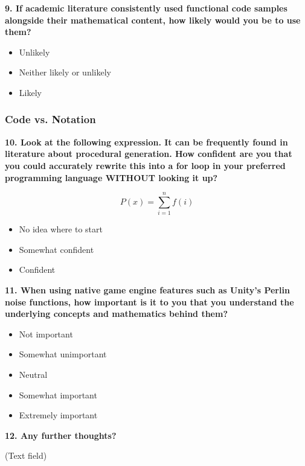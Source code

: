 \vspace{2em}

\textbf{9. If academic literature consistently used functional code samples alongside their mathematical content, how likely would you be to use them?}

\begin{itemize}
    \item Unlikely
    \item Neither likely or unlikely
    \item Likely
\end{itemize}


\subsubsection{Code vs. Notation}

\textbf{10. Look at the following expression. It can be frequently found in literature about procedural generation. How confident are you that you could accurately rewrite this into a for loop in your preferred programming language WITHOUT looking it up?}

$$P(x) = \sum_{i=1}^{n} f(i)$$

\begin{itemize}
    \item No idea where to start
    \item Somewhat confident
    \item Confident
\end{itemize}

\textbf{11. When using native game engine features such as Unity's Perlin noise functions, how important is it to you that you understand the underlying concepts and mathematics behind them?}

\begin{itemize}
    \item Not important
    \item Somewhat unimportant
    \item Neutral
    \item Somewhat important
    \item Extremely important
\end{itemize}

\vspace{2em}

\textbf{12. Any further thoughts?}

\begin{center}
    (Text field)
\end{center}

